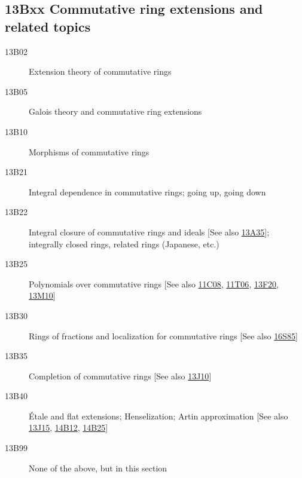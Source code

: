 \documentclass[letterpaper]{article}
\begin{document}
\subsection*{13Bxx Commutative ring extensions and related topics }\label{13Bxx}
\begin{description}          
\item [13B02]\label{13B02} Extension theory of commutative rings
\item [13B05]\label{13B05} Galois theory and commutative ring extensions
\item [13B10]\label{13B10} Morphisms of commutative rings
\item [13B21]\label{13B21} Integral dependence in commutative rings; going up, going down
\item [13B22]\label{13B22} Integral closure of commutative rings and ideals [See also \hyperref[13A35]{13A35}]; integrally closed rings, related rings (Japanese, etc.)
\item [13B25]\label{13B25} Polynomials over commutative rings [See also \hyperref[11C08]{11C08}, \hyperref[11T06]{11T06}, \hyperref[13F20]{13F20}, \hyperref[13M10]{13M10}]
\item [13B30]\label{13B30} Rings of fractions and localization for commutative rings [See also \hyperref[16S85]{16S85}]
\item [13B35]\label{13B35} Completion of commutative rings [See also \hyperref[13J10]{13J10}]
\item [13B40]\label{13B40} \'{E}tale and flat extensions; Henselization; Artin approximation [See also \hyperref[13J15]{13J15}, \hyperref[14B12]{14B12}, \hyperref[14B25]{14B25}]
\item [13B99]\label{13B99} None of the above, but in this section
\end{description}          
\end{document}
